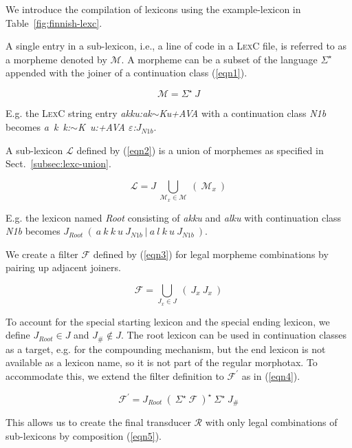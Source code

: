 \documentclass[a4paper]{article}
\begin{document}
We introduce the compilation of lexicons using the example-lexicon in
Table~\ref{fig:finnish-lexc}.

A single entry in a sub-lexicon, i.e., a line of code in a
\textsc{LexC} file, is referred to as a morpheme denoted by
$\mathcal{M}$. A morpheme can be a subset of the language
$\Sigma^{\star}$ appended with the joiner of a continuation class
(\ref{eqn1}).

\begin{equation}
  \label{eqn1}
  \mathcal{M} = \Sigma^{\star}~J
\end{equation}

E.g. the \textsc{LexC} string entry \emph{akku\text:ak$\sim$Ku+AVA}
with a continuation class \emph{N1b} becomes
\emph{a~k~k:$\sim$K~u:+AVA $\varepsilon$:$J_{N1b}$}.

A sub-lexicon $\mathcal{L}$ defined by (\ref{eqn2}) is a union of
morphemes as specified in Sect.~\ref{subsec:lexc-union}.

\begin{equation}
  \label{eqn2}
  \mathcal{L} = J~\bigcup_{\mathcal{M}_{x} \in \mathcal{M}}~(~\mathcal{M}_{x}~)
\end{equation}

E.g. the lexicon named \emph{Root} consisting of \emph{akku} and
\emph{alku} with continuation class \emph{N1b} becomes
$J_{Root}~(~a~k~k~u~J_{N1b}~|~a~l~k~u~J_{N1b}~)$.

We create a filter $\mathcal{F}$ defined by (\ref{eqn3}) for legal
morpheme combinations by pairing up adjacent joiners.

\begin{equation}
  \label{eqn3}
  \mathcal{F} = \bigcup_{J_{x} \in J}~(~J_{x}~J_{x}~)
\end{equation}

To account for the special starting lexicon and the special ending
lexicon, we define $J_{Root} \in J$ and $J_{\#} \notin J$. The root
lexicon can be used in continuation classes as a target, e.g. for the
compounding mechanism, but the end lexicon is not available as a
lexicon name, so it is not part of the regular morphotax. To
accommodate this, we extend the filter definition to
$\mathcal{F}^{\prime}$ as in (\ref{eqn4}).

\begin{equation}
  \label{eqn4}
  \mathcal{F}^{\prime} = J_{Root}~(~\Sigma^{\star}~\mathcal{F}~)^{\star}~\Sigma^{\star}~J_{\#}
\end{equation}

This allows us to create the final transducer $\mathcal{R}$ with only
legal combinations of sub-lexicons by composition (\ref{eqn5}).
\end{document}
